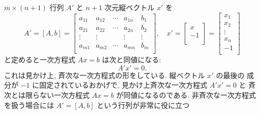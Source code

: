 \documentclass[12pt,twoside]{jarticle}
\begin{document}
$m\times(n+1)$ 行列 $A'$ と $n+1$ 次元縦ベクトル $x'$ を
\begin{equation*}
  A' = [A,b] =
  \begin{bmatrix}
    a_{11} & a_{12} & \cdots & a_{1n} & b_1 \\
    a_{21} & a_{22} & \cdots & a_{2n} & b_2 \\
    \vdots & \vdots &        & \vdots & \vdots \\
    a_{m1} & a_{m2} & \cdots & a_{mn} & b_m \\
  \end{bmatrix},
  \quad
  x' = 
  \begin{bmatrix}
    x \\
    -1 \\
  \end{bmatrix}
  =
  \begin{bmatrix}
    x_1 \\
    x_2 \\
    \vdots \\
    x_n \\
    -1 \\
  \end{bmatrix}
\end{equation*}
と定めると一次方程式 $Ax=b$ は次と同値になる:
\begin{equation*}
  A'x' = 0.
\end{equation*}
これは見かけ上, 斉次な一次方程式の形をしている. 縦ベクトル $x'$ の最後の
成分が $-1$ に固定されているおかげで, 見かけ上斉次な一次方程式 $A'x'=0$ と
斉次とは限らない一次方程式 $Ax=b$ が同値になるのである.  
非斉次な一次方程式を扱う場合には $A'=[A,b]$ という行列が非常に役に立つ%
\end{document}
